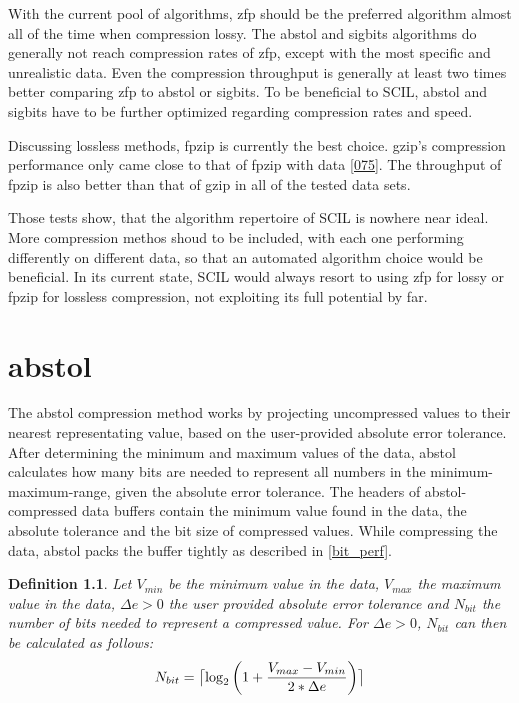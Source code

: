 \documentclass[
	12pt,
	a4paper,
	BCOR10mm,
	DIV14,
	headsepline,
]{scrreprt}
\newtheorem{definition}{Definition}
\DeclarePairedDelimiter{\ceil}{\lceil}{\rceil}
\begin{document}
With the current pool of algorithms, zfp should be the preferred algorithm
almost all of the time when compression lossy. The abstol and sigbits algorithms
do generally not reach compression rates of zfp, except with the most
specific and unrealistic data. Even the compression throughput is generally at
least two times better comparing zfp to abstol or sigbits. To be beneficial to
SCIL, abstol and sigbits have to be further optimized regarding compression
rates and speed. \par
Discussing lossless methods, fpzip is currently the best choice. gzip's
compression performance only came close to that of fpzip with data \ref{075}.
The throughput of fpzip is also better than that of gzip in all of the tested
data sets. \par
Those tests show, that the algorithm repertoire of SCIL is nowhere near ideal.
More compression methos shoud to be included, with each one performing differently
on different data, so that an automated algorithm choice would be beneficial.
In its current state, SCIL would always resort to using zfp for lossy or fpzip for
lossless compression, not exploiting its full potential by far.





\appendix
\appendixpage

\chapter{abstol}
\label{abstol}

\bigskip

The abstol compression method works by projecting uncompressed values to their
nearest representating value, based on the user-provided absolute error
tolerance. After determining the minimum and maximum values of the data, abstol
calculates how many bits are needed to represent all numbers in the
minimum-maximum-range, given the absolute error tolerance. The headers of
abstol-compressed data buffers contain the minimum value found in the data, the
absolute tolerance and the bit size of compressed values. While compressing the
data, abstol packs the buffer tightly as described in \cref{bit_perf}.

\bigskip

\begin{definition} \label{D:abstol_nbits}
	Let $V_{min}$ be the minimum value in the data, $V_{max}$ the maximum value
	in the data, $\Delta{e} > 0$ the user provided absolute error tolerance and
	$N_{bit}$ the number of bits needed to represent a compressed value. For
	$\Delta{e}>0$, $N_{bit}$ can then be calculated as follows:
	\[
		N_{bit} =
			\ceil[\big]{
				\log_2{
					\left(
						1 + \frac{V_{max} - V_{min}}{2 * \Delta{e}}
					\right)
				}
			}
	\]
\end{definition}
\end{document}
